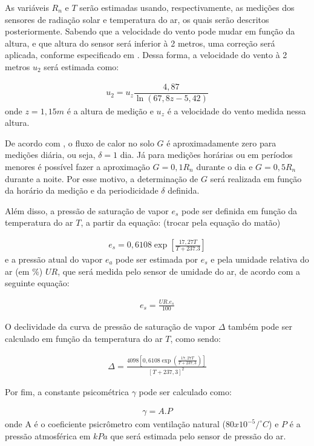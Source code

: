 		As variáveis $R_n$ e $T$ serão estimadas usando, respectivamente, as medições dos sensores de radiação solar e temperatura do ar, os quais serão descritos posteriormente. Sabendo que a velocidade do vento pode mudar em função da altura, e que altura do sensor será inferior à 2 metros, uma correção será aplicada, conforme especificado em \cite{bib_sen_08_victor}. Dessa forma, a velocidade do vento à 2 metros $u_2$ será estimada como:

		\begin{eqnarray}
			u_2 = u_{z}\dfrac {4,87}{\ln \left( 67,8z-5,42\right)}
		\end{eqnarray}
		onde $z = 1,15m$ é a altura de medição e $u_z$ é a velocidade do vento medida nessa altura.

		De acordo com \cite{bib_sen_08_victor}, o fluxo de calor no solo $G$ é aproximadamente zero para medições diária, ou seja, $\delta = 1$ dia. Já para medições horárias ou em períodos menores é possível fazer a aproximação $G=0,1 R_n$ durante o dia e $G=0,5 R_n$ durante a noite. Por esse motivo, a determinação de $G$ será realizada em função da horário da medição e da periodicidade $\delta$ definida.

		Além disso, a pressão de saturação de vapor $e_s$ pode ser definida em função da temperatura do ar $T$, a partir da equação: (trocar pela equação do matão)

		\begin{eqnarray}
			e_s = 0,6108 \exp \left[ \frac {17,27T}{T+237.3}\right]
		\end{eqnarray}
		e a pressão atual do vapor $e_a$ pode ser estimada por $e_s$ e pela umidade relativa do ar (em $\%$) $UR$, que será medida pelo sensor de umidade do ar, de acordo com a seguinte equação:

		\begin{eqnarray}
			e_s = \frac {UR.e_s}{100}
		\end{eqnarray}
		
		O declividade da curva de pressão de saturação de vapor $\Delta$ também pode ser calculado em função da temperatura do ar $T$, como sendo:

		\begin{eqnarray}
			\Delta = \frac {4098\left[ 0,6108\exp \left( \frac {17,27T}{T+237,3}\right) \right] }{\left[ T+237,3\right] ^{2}}
		\end{eqnarray}
		
		Por fim, a constante psicométrica $\gamma$ pode ser calculado como:

		\begin{eqnarray}
			\gamma = A.P
		\end{eqnarray}
		onde A é o coeficiente psicrômetro com ventilação natural ($80x10^{-5}/^{\circ}C$) e $P$ é a pressão atmosférica em $kPa$ que será estimada pelo sensor de pressão do ar.

